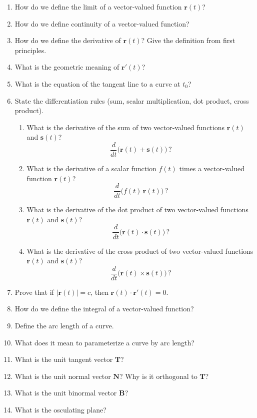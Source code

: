 \begin{enumerate}[resume]
  \item How do we define the limit of a vector-valued function \(\mathbf{r}(t)\)?
  \item How do we define continuity of a vector-valued function?
  \item How do we define the derivative of \(\mathbf{r}(t)\)? Give the definition from first principles.
  \item What is the geometric meaning of \(\mathbf{r}'(t)\)?
  \item What is the equation of the tangent line to a curve at \(t_{0}\)?
  \item State the differentiation rules (sum, scalar multiplication, dot product, cross product).
    \begin{enumerate}
      \item What is the derivative of the sum of two vector-valued functions \(\mathbf{r}(t)\) and \(\mathbf{s}(t)\)?
        \[ \frac{d}{dt}\big(\mathbf{r}(t) + \mathbf{s}(t)\big)\,? \]
      \item What is the derivative of a scalar function \(f(t)\) times a vector-valued function \(\mathbf{r}(t)\)?
        \[ \frac{d}{dt}\big(f(t)\,\mathbf{r}(t)\big)\,? \]
      \item What is the derivative of the dot product of two vector-valued functions \(\mathbf{r}(t)\) and \(\mathbf{s}(t)\)?
        \[ \frac{d}{dt}\big(\mathbf{r}(t)\cdot \mathbf{s}(t)\big)\,? \]
      \item What is the derivative of the cross product of two vector-valued functions \(\mathbf{r}(t)\) and \(\mathbf{s}(t)\)?
        \[ \frac{d}{dt}\big(\mathbf{r}(t)\times \mathbf{s}(t)\big)\,? \]
    \end{enumerate}
  \item Prove that if \(|\mathbf{r}(t)| = c\), then \(\mathbf{r}(t) \cdot \mathbf{r}'(t) = 0\).
  \item How do we define the integral of a vector-valued function?
  \item Define the arc length of a curve.
  \item What does it mean to parameterize a curve by arc length?
  \item What is the unit tangent vector \(\mathbf{T}\)?
  \item What is the unit normal vector \(\mathbf{N}\)? Why is it orthogonal to \(\mathbf{T}\)?
  \item What is the unit binormal vector \(\mathbf{B}\)?
  \item What is the osculating plane?

\end{enumerate}
